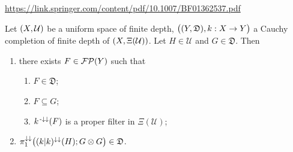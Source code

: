 \url{https://link.springer.com/content/pdf/10.1007/BF01362537.pdf}


\begin{lemma}
Let $\sSet{X, \mathcal{U}}$ be a uniform space of finite depth, $\sSet[\big]{\sSet{Y, \mathfrak{D}}, k: X\to Y}$ a Cauchy completion of finite depth of $\sSet{X, \Xi(\mathcal{U})}$. Let $H\in \mathcal{U}$ and $G\in \mathfrak{D}$. Then
\begin{enumerate}
\item there exists $F\in\operatorname{\mathcal{FP}}(Y)$ such that
\begin{enumerate}
\item $F\in \mathfrak{D}$;
\item $F\subseteq G$;
\item $k^{{\text{\hspace{0.15em}-}\downarrow}\downarrow}(F)$ is a proper filter in $\Xi(\mathcal{U})$;
\end{enumerate}
\item $\pi_1^{\downarrow\downarrow}\big((k|k)^{\downarrow\downarrow}(H); G\otimes G\big)\in \mathfrak{D}$.
\end{enumerate}
\end{lemma}

